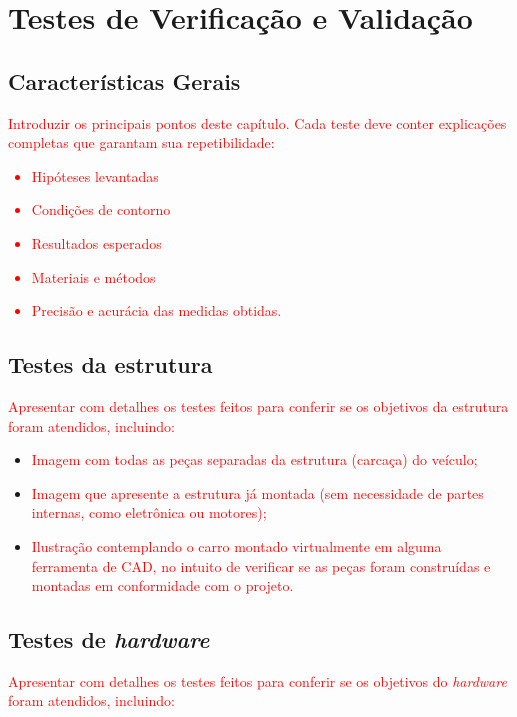 \chapter{Testes de Verificação e Validação}

\section{Características Gerais}

\textcolor{red}{Introduzir os principais pontos deste capítulo. Cada teste deve conter explicações completas que garantam sua repetibilidade:
\begin{itemize}
    \item Hipóteses levantadas
    \item Condições de contorno
    \item Resultados esperados
    \item Materiais e métodos
    \item Precisão e acurácia das medidas obtidas.
\end{itemize}
}

\section{Testes da estrutura}

\textcolor{red}{Apresentar com detalhes os testes feitos para conferir se os objetivos da estrutura foram atendidos, incluindo:}

\begin{itemize}
    \item \textcolor{red}{Imagem com todas as peças separadas da estrutura (carcaça) do veículo;}
    \item \textcolor{red}{Imagem que apresente a estrutura já montada (sem necessidade de partes internas, como eletrônica ou motores);}
    \item \textcolor{red}{Ilustração contemplando o carro montado virtualmente em alguma ferramenta de CAD, no intuito de verificar se as peças foram construídas e montadas em conformidade com o projeto.}
\end{itemize}

\section{Testes de \textit{hardware}}

\textcolor{red}{Apresentar com detalhes os testes feitos para conferir se os objetivos do \textit{hardware} foram atendidos, incluindo:}

